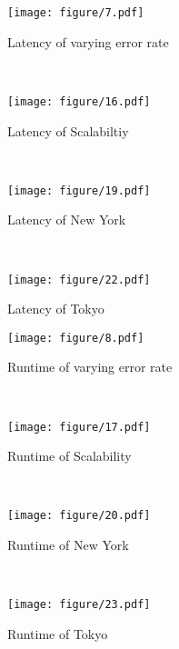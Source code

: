 \begin{figure*}[htb]
	\centering
	\begin{subfigure}[b]{0.22\textwidth}
		\texttt{[image: figure/7.pdf]}
		\caption{\footnotesize{Latency of varying error rate}}
		\label{fig:muP}
	\end{subfigure}
	~~
	\begin{subfigure}[b]{0.22\textwidth}
		\texttt{[image: figure/16.pdf]}
		\caption{\footnotesize{Latency of Scalabiltiy}}
		\label{fig:lambdaP}
	\end{subfigure}
	~~
	\begin{subfigure}[b]{0.22\textwidth}
		\texttt{[image: figure/19.pdf]}
		\caption{\footnotesize{Latency of New York}}
		\label{fig:muU}
	\end{subfigure}
	~~
	\begin{subfigure}[b]{0.22\textwidth}
		\texttt{[image: figure/22.pdf]}
		\caption{\footnotesize{Latency of Tokyo}}
		\label{fig:lambdaU}
	\end{subfigure}
	
	\begin{subfigure}[b]{0.22\textwidth}
		\texttt{[image: figure/8.pdf]}
		\caption{\footnotesize{Runtime of varying error rate}}
		\label{fig:card_v_time}
	\end{subfigure}
	~~
	\begin{subfigure}[b]{0.22\textwidth}
		\texttt{[image: figure/17.pdf]}
		\caption{\footnotesize{Runtime of Scalability}}
		\label{fig:card_u_time}
	\end{subfigure}
	~~
	\begin{subfigure}[b]{0.22\textwidth}
		\texttt{[image: figure/20.pdf]}
		\caption{\footnotesize{Runtime of New York}}
		\label{fig:dim_time}
	\end{subfigure}
	~~
	\begin{subfigure}[b]{0.22\textwidth}
		\texttt{[image: figure/23.pdf]}
		\caption{\footnotesize{Runtime of Tokyo}}
		\label{fig:cf_time}
	\end{subfigure}
	

\end{figure*}

